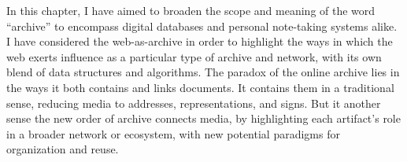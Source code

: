 In this chapter, I have aimed to broaden the scope and meaning of the word ``archive'' to encompass digital databases and personal note-taking systems alike. I have considered the web-as-archive in order to highlight the ways in which the web exerts influence as a particular type of archive and network, with its own blend of data structures and algorithms. The paradox of the online archive lies in the ways it both contains and links documents. It contains them in a traditional sense, reducing media to addresses, representations, and signs. But it another sense the new order of archive connects media, by highlighting each artifact's role in a broader network or ecosystem, with new potential paradigms for organization and reuse.
